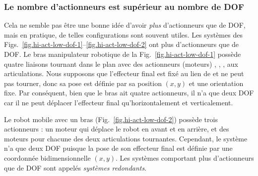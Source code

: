 {\subsubsection*{Le nombre d'actionneurs est supérieur au nombre de DOF}

Cela ne semble pas être une bonne idée d'avoir \emph{plus} d'actionneurs que de DOF, mais en pratique, de telles configurations sont souvent utiles. Les systèmes des Figs.~\ref{fig.hi-act-low-dof-1}--\ref{fig.hi-act-low-dof-2} ont plus d'actionneurs que de DOF. Le bras manipulateur robotique de la Fig.~\ref{fig.hi-act-low-dof-1} possède quatre liaisons tournant dans le plan avec des actionneurs (moteurs) , , ,  aux articulations. Nous supposons que l'effecteur final est fixé au lien de  et ne peut pas tourner, donc sa pose est définie par sa position $(x,y)$ et une orientation fixe. Par conséquent, bien que le bras ait quatre actionneurs, il n'a que deux DOF car il ne peut déplacer l'effecteur final qu'horizontalement et verticalement.

Le robot mobile avec un bras (Fig.~\ref{fig.hi-act-low-dof-2}) possède trois actionneurs : un moteur qui déplace le robot en avant et en arrière, et des moteurs pour chacune des deux articulations tournantes. Cependant, le système n'a que deux DOF puisque la pose de son effecteur final est définie par une coordonnée bidimensionnelle $(x,y)$. Les systèmes comportant plus d'actionneurs que de DOF sont appelés \emph{systèmes redondants}.

}
